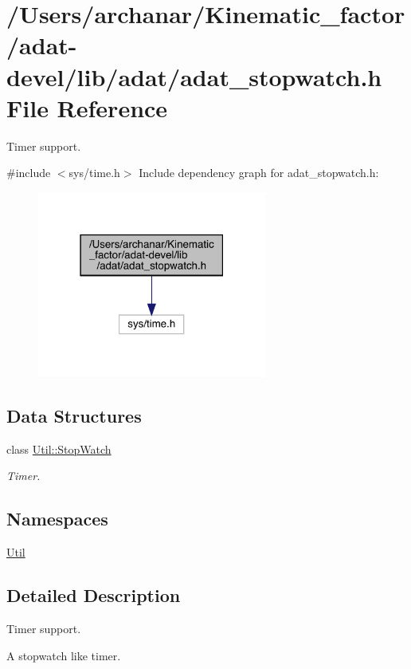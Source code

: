 \hypertarget{adat-devel_2lib_2adat_2adat__stopwatch_8h}{}\section{/\+Users/archanar/\+Kinematic\+\_\+factor/adat-\/devel/lib/adat/adat\+\_\+stopwatch.h File Reference}
\label{adat-devel_2lib_2adat_2adat__stopwatch_8h}


Timer support.  


{\ttfamily \#include $<$sys/time.\+h$>$}\newline
Include dependency graph for adat\+\_\+stopwatch.\+h\+:
\nopagebreak
\begin{figure}[H]
\begin{center}
\leavevmode
\includegraphics[width=214pt]{d8/d1b/adat-devel_2lib_2adat_2adat__stopwatch_8h__incl}
\end{center}
\end{figure}
\subsection*{Data Structures}
\begin{DoxyCompactItemize}
\item 
class \mbox{\hyperlink{classUtil_1_1StopWatch}{Util\+::\+Stop\+Watch}}
\begin{DoxyCompactList}\small\item\em Timer. \end{DoxyCompactList}\end{DoxyCompactItemize}
\subsection*{Namespaces}
\begin{DoxyCompactItemize}
\item 
 \mbox{\hyperlink{namespaceUtil}{Util}}
\end{DoxyCompactItemize}


\subsection{Detailed Description}
Timer support. 

A stopwatch like timer. 